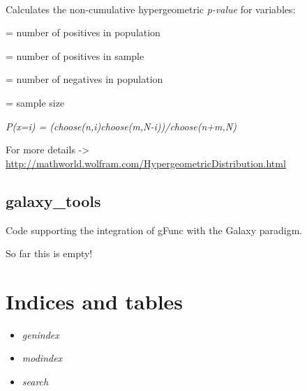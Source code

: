 \documentclass[letterpaper,10pt,english]{sphinxmanual}
\begin{document}

\begin{fulllineitems}
\label{code:gfunc.stats.hypergeoP}~
\begin{DUlineblock}{0em}
\item[] Calculates the non-cumulative hypergeometric \emph{p-value} for variables:
\item[] 
\item[]  = number of positives in population
\item[]  = number of positives in sample
\item[]  = number of negatives in population
\item[]  = sample size
\item[] 
\item[] \emph{P(x=i) = (choose(n,i)choose(m,N-i))/choose(n+m,N)}
\item[] 
\item[] For more details -\textgreater{} \href{http://mathworld.wolfram.com/HypergeometricDistribution.html}{http://mathworld.wolfram.com/HypergeometricDistribution.html}
\end{DUlineblock}

\end{fulllineitems}

\label{code:module-gfunc.xpermutations}\label{code:module-gfunc.galaxy_tools}

\section{galaxy\_tools}
\label{code:galaxy-tools}
Code supporting the integration of gFunc with the Galaxy paradigm.

So far this is empty!


\chapter{Indices and tables}
\label{index:indices-and-tables}\begin{itemize}
\item {} 
\emph{genindex}

\item {} 
\emph{modindex}

\item {} 
\emph{search}

\end{itemize}
\end{document}
